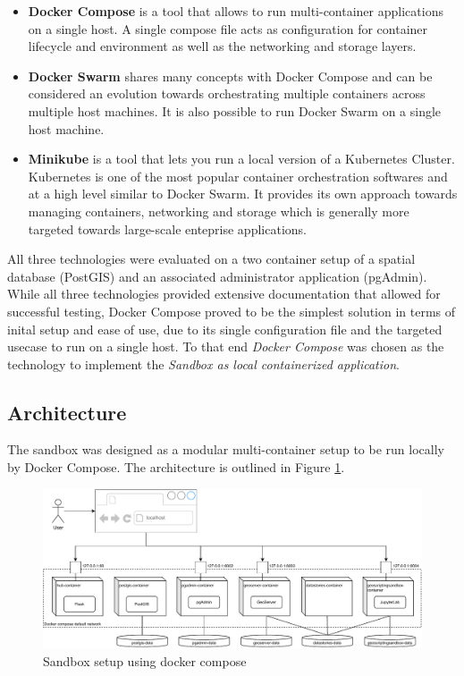 \documentclass[11pt, a4paper, oneside, parskip=full-]{scrartcl}
\begin{document}
\begin{itemize}
  \item \textbf{Docker Compose}\cite{dockercompose} is a tool that allows to run
  multi-container applications on a single host. A single compose file acts as
  configuration for container lifecycle and environment as well as the
  networking and storage layers.
  \item \textbf{Docker Swarm}\cite{dockerswarm} shares many concepts with Docker
  Compose and can be considered an evolution towards orchestrating multiple
  containers across multiple host machines. It is also possible to run Docker
  Swarm on a single host machine.
  \item \textbf{Minikube}\cite{minikube} is a tool that lets you run a local
  version of a Kubernetes Cluster. Kubernetes is one of the most popular
  container orchestration softwares and at a high level similar to Docker Swarm.
  It provides its own approach towards managing containers, networking and
  storage which is generally more targeted towards large-scale enteprise
  applications.
\end{itemize}

All three technologies were evaluated on a two container setup of a spatial
database (PostGIS) and an associated administrator application (pgAdmin). While
all three technologies provided extensive documentation that allowed for
successful testing, Docker Compose proved to be the simplest solution in terms
of inital setup and ease of use, due to its single configuration file and the
targeted usecase to run on a single host. To that end \emph{Docker Compose} was
chosen as the technology to implement the \emph{Sandbox as local containerized
application}.


\subsection{Architecture}
The sandbox was designed as a modular multi-container setup to be run locally by
Docker Compose. The architecture is outlined in Figure \ref{fig:sandboxsetup}.

\begin{figure}[H]
  \centering
  \includegraphics[width=1\textwidth]{composeSetup}
  \caption{Sandbox setup using docker compose}
  \label{fig:sandboxsetup}
\end{figure}
\end{document}
